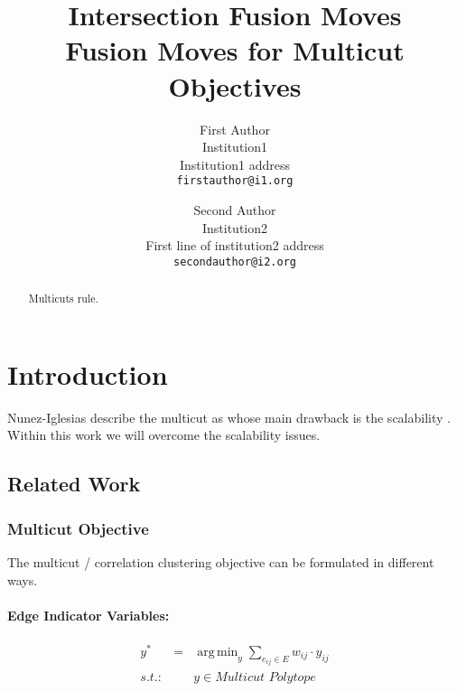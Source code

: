 \documentclass[10pt,twocolumn,letterpaper]{article}
\DeclareMathOperator*{\argmin}{arg\,min}
\begin{document}

\title{Intersection Fusion Moves \\ Fusion Moves for Multicut Objectives}

\author{First Author\\
Institution1\\
Institution1 address\\
{\tt\small firstauthor@i1.org}
\and
Second Author\\
Institution2\\
First line of institution2 address\\
{\tt\small secondauthor@i2.org}
}

\maketitle

\begin{abstract}
   Multicuts rule.
\end{abstract}
\section{Introduction}
    
  Nunez-Iglesias \etal describe the multicut as
   whose 
  main drawback is the scalability \cite{nunez_iglesias_2013}.
  Within this work we will overcome the scalability issues.



\subsection{Related Work}


\subsubsection{Multicut Objective}

The multicut / correlation clustering objective 
can be formulated in different ways.



\paragraph{Edge Indicator Variables:}
\begin{center}
    \begin{eqnarray}
        y^* &=& \argmin_{y} \sum_{ e_{ij} \in E } w_{ij} \cdot y_{ij} \\
        s.t.:& & y \in \textit{Multicut Polytope} \nonumber
    \end{eqnarray}
\end{center}
\end{document}
